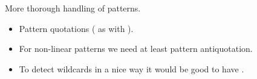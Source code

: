 More thorough handling of patterns.
\begin{itemize}
\item Pattern quotations ( as with ).
\item For non-linear patterns we need at least pattern antiquotation.
\item To detect wildcards in a nice way it would be good to have .
\end{itemize}

